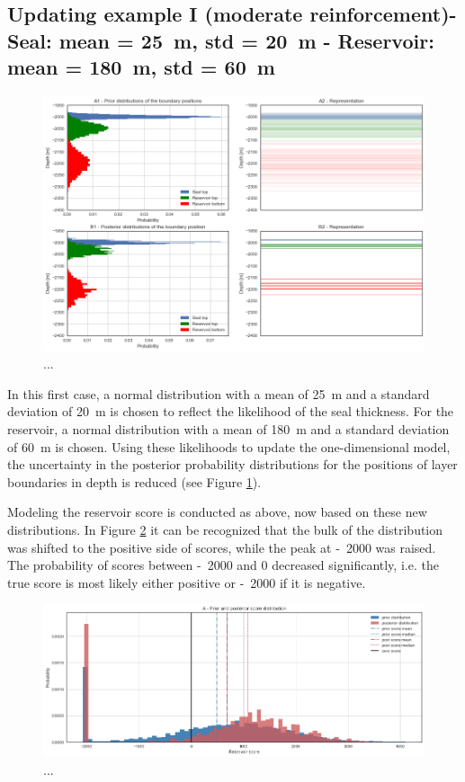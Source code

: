 	\subsection{Updating example I (moderate reinforcement)- Seal: mean = 25~m, std = 20~m - Reservoir: mean = 180~m, std = 60~m}
	
	\begin{figure}[h]
		\centering
		\includegraphics[width=1\textwidth]{Figures/update_moderate1.png}
		\caption{...}\label{fig:update_moderate1} 
	\end{figure}
	
	In this first case, a normal distribution with a mean of 25~m and a standard deviation of 20~m is chosen to reflect the likelihood of the seal thickness. For the reservoir, a normal distribution with a mean of 180~m and a standard deviation of 60~m is chosen. Using these likelihoods to update the one-dimensional model, the uncertainty in the posterior probability distributions for the positions of layer boundaries in depth is reduced (see Figure \ref{fig:update_moderate1}).
		
	Modeling the reservoir score is conducted as above, now based on these new distributions. In Figure \ref{fig:update_moderate2} it can be recognized that the bulk of the distribution was shifted to the positive side of scores, while the peak at -~2000 was raised. The probability of scores between -~2000 and 0 decreased significantly, i.e. the true score is most likely either positive or -~2000 if it is negative.
	
	\begin{figure}[h]
		\centering
		\includegraphics[width=1\textwidth]{Figures/update_moderate2.png}
		\caption{...}\label{fig:update_moderate2} 
	\end{figure}
	
